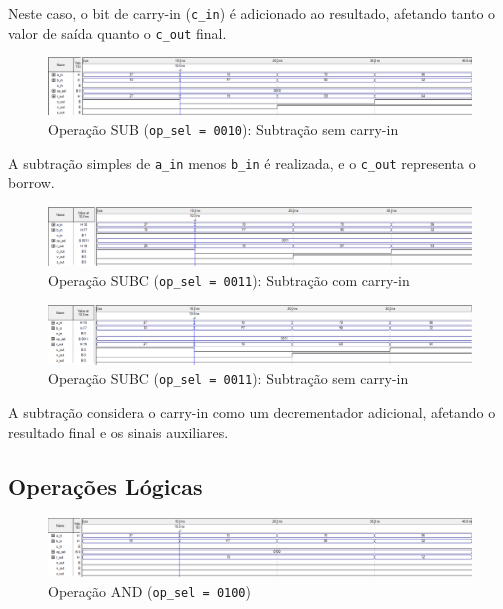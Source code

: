 Neste caso, o bit de carry-in (\texttt{c\_in}) é adicionado ao resultado, afetando tanto o valor de saída quanto o \texttt{c\_out} final.

\begin{figure}[H]
\centering
\includegraphics[width=\textwidth]{images/alu_0010.png}
\caption{Operação SUB (\texttt{op\_sel = 0010}): Subtração sem carry-in}
\end{figure}

A subtração simples de \texttt{a\_in} menos \texttt{b\_in} é realizada, e o \texttt{c\_out} representa o borrow.

\begin{figure}[H]
\centering
\includegraphics[width=\textwidth]{images/alu_0011_com_carry_in.png}
\caption{Operação SUBC (\texttt{op\_sel = 0011}): Subtração com carry-in}
\end{figure}

\begin{figure}[H]
\centering
\includegraphics[width=\textwidth]{images/alu_0011_sem_carry_in.png}
\caption{Operação SUBC (\texttt{op\_sel = 0011}): Subtração sem carry-in}
\end{figure}

A subtração considera o carry-in como um decrementador adicional, afetando o resultado final e os sinais auxiliares.

\subsection{Operações Lógicas}

\begin{figure}[H]
\centering
\includegraphics[width=\textwidth]{images/alu_0100.png}
\caption{Operação AND (\texttt{op\_sel = 0100})}
\end{figure}

